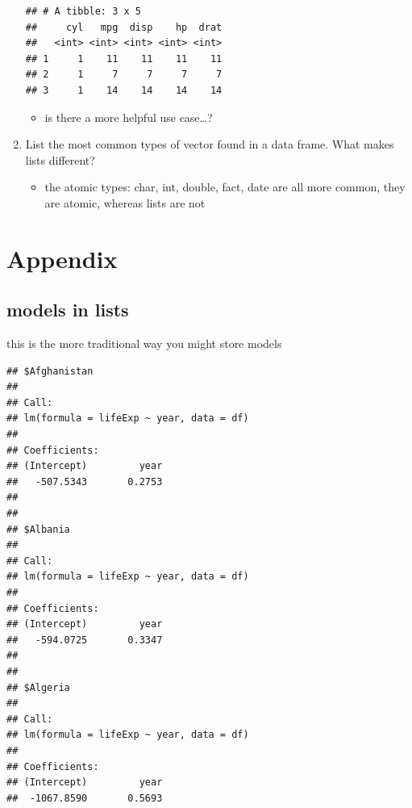 \documentclass[]{book}
\newenvironment{Shaded}{\begin{snugshade}}{\end{snugshade}}
\newcommand{\DecValTok}[1]{\textcolor[rgb]{0.00,0.00,0.81}{#1}}
\newcommand{\KeywordTok}[1]{\textcolor[rgb]{0.13,0.29,0.53}{\textbf{#1}}}
\newcommand{\NormalTok}[1]{#1}
\newcommand{\OperatorTok}[1]{\textcolor[rgb]{0.81,0.36,0.00}{\textbf{#1}}}
\newcommand{\StringTok}[1]{\textcolor[rgb]{0.31,0.60,0.02}{#1}}
\providecommand{\tightlist}{%
  \setlength{\itemsep}{0pt}\setlength{\parskip}{0pt}}
\theoremstyle{definition}
\theoremstyle{definition}
\theoremstyle{definition}
\theoremstyle{remark}
\begin{document}
\begin{enumerate}
\begin{verbatim}
## # A tibble: 3 x 5
##     cyl   mpg  disp    hp  drat
##   <int> <int> <int> <int> <int>
## 1     1    11    11    11    11
## 2     1     7     7     7     7
## 3     1    14    14    14    14
\end{verbatim}

  \begin{itemize}
  \tightlist
  \item
    is there a more helpful use case\ldots{}?
  \end{itemize}
\item
  List the most common types of vector found in a data frame. What makes
  lists different?

  \begin{itemize}
  \tightlist
  \item
    the atomic types: char, int, double, fact, date are all more common,
    they are atomic, whereas lists are not
  \end{itemize}
\end{enumerate}

\hypertarget{appendix-10}{%
\chapter{Appendix}\label{appendix-10}}

\hypertarget{models-in-lists}{%
\section{models in lists}\label{models-in-lists}}

this is the more traditional way you might store models

\begin{Shaded}
\end{Shaded}

\begin{verbatim}
## $Afghanistan
## 
## Call:
## lm(formula = lifeExp ~ year, data = df)
## 
## Coefficients:
## (Intercept)         year  
##   -507.5343       0.2753  
## 
## 
## $Albania
## 
## Call:
## lm(formula = lifeExp ~ year, data = df)
## 
## Coefficients:
## (Intercept)         year  
##   -594.0725       0.3347  
## 
## 
## $Algeria
## 
## Call:
## lm(formula = lifeExp ~ year, data = df)
## 
## Coefficients:
## (Intercept)         year  
##  -1067.8590       0.5693
\end{verbatim}
\end{document}
